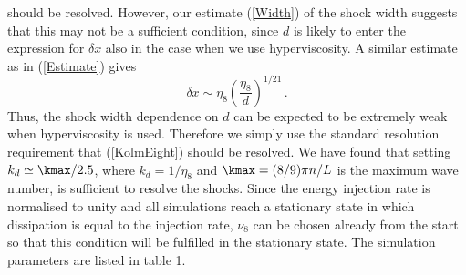 should be resolved. However, our estimate (\ref{Width}) of the shock width suggests that this may not be a sufficient condition, since $ d $ is likely to enter the expression for $ \delta x $ also in the case when we use hyperviscosity.
A similar estimate as in (\ref{Estimate}) gives
\begin{equation} \label{EtaEight}
\delta x \sim \eta_{8} \left ( \frac{\eta_8}{d} \right)^{1/21} \, .
\end{equation} 
Thus, the shock width dependence on $ d $ can be expected to be extremely weak when hyperviscosity is used. Therefore we simply use the standard resolution requirement that (\ref{KolmEight}) should be resolved. We have found that setting
$  k_{d} \simeq \kmax/ 2.5$, where $ k_{d} = 1/\eta_8 $ and $\kmax =
(8/9)\pi n/L $ is the maximum wave number, is  sufficient to resolve the shocks. Since the energy injection rate is normalised to unity and all simulations reach a stationary state in which dissipation is equal to the injection rate, $ \nu_8 $ can be chosen already from the start so that this condition will be fulfilled in the stationary state. 
 The  simulation parameters are listed in table 1.

